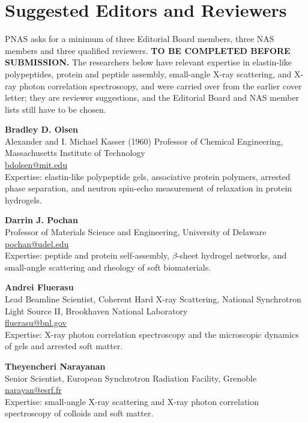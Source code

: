\documentclass[10pt]{article}
\begin{document}
\section*{Suggested Editors and Reviewers}
\small
PNAS asks for a minimum of three Editorial Board members, three NAS members and
three qualified reviewers. \textbf{TO BE COMPLETED BEFORE SUBMISSION.} The
researchers below have relevant expertise in elastin-like polypeptides,
protein and peptide assembly, small-angle X-ray scattering, and X-ray photon
correlation spectroscopy, and were carried over from the earlier cover letter;
they are reviewer suggestions, and the Editorial Board and NAS member lists
still have to be chosen.

\textbf{Bradley D. Olsen}\\
Alexander and I. Michael Kasser (1960) Professor of Chemical Engineering, Massachusetts Institute of Technology\\
\href{mailto:bdolsen@mit.edu}{bdolsen@mit.edu}\\
Expertise: elastin-like polypeptide gels, associative protein polymers, arrested phase separation, and neutron spin-echo measurement of relaxation in protein hydrogels.

\textbf{Darrin J. Pochan}\\
Professor of Materials Science and Engineering, University of Delaware\\
\href{mailto:pochan@udel.edu}{pochan@udel.edu}\\
Expertise: peptide and protein self-assembly, $\beta$-sheet hydrogel networks, and small-angle scattering and rheology of soft biomaterials.

\textbf{Andrei Fluerasu}\\
Lead Beamline Scientist, Coherent Hard X-ray Scattering, National Synchrotron Light Source II, Brookhaven National Laboratory\\
\href{mailto:fluerasu@bnl.gov}{fluerasu@bnl.gov}\\
Expertise: X-ray photon correlation spectroscopy and the microscopic dynamics of gels and arrested soft matter.

\textbf{Theyencheri Narayanan}\\
Senior Scientist, European Synchrotron Radiation Facility, Grenoble\\
\href{mailto:narayan@esrf.fr}{narayan@esrf.fr}\\
Expertise: small-angle X-ray scattering and X-ray photon correlation spectroscopy of colloids and soft matter.
\end{document}

